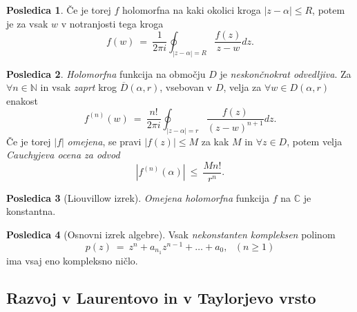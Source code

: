 \documentclass[11pt]{article}
\theoremstyle{definition}
\theoremstyle{definition}
\theoremstyle{definition}
\newtheorem*{posledica}{Posledica}
\begin{document}
\begin{posledica}

Če je torej  $f$ holomorfna na kaki okolici kroga $|z - \alpha| \leq R$, potem je za vsak $w$ v notranjosti tega kroga
$$f(w) ~=~ \frac{1}{2 \pi i} \oint_{|z - \alpha| = R} \frac{f(z)}{z - w} dz.$$

\end{posledica}
\vspace{0.5cm}

\begin{posledica}

\textit{Holomorfna} funkcija na območju $D$ je \textit{neskončnokrat odvedljiva}. Za $\forall n \in \mathbb{N}$ in vsak \textit{zaprt} krog $\overline{D}(\alpha, r)$, vsebovan v $D$, velja za $\forall w \in D(\alpha, r)$ enakost
$$f^{(n)}(w) ~=~ \frac{n!}{2 \pi i} \oint_{|z - \alpha| = r} \frac{f(z)}{(z - w)^{n+1}} dz.$$
Če je torej $|f|$ \textit{omejena}, se pravi $|f(z)| \leq M$ za kak $M$ in $\forall z \in D$, potem velja \textit{Cauchyjeva ocena za odvod}
$$|f^{(n)}(\alpha)| ~\leq~ \frac{Mn!}{r^n}.$$ 

\end{posledica}
\vspace{0.5cm}

\begin{posledica}[Liouvillow izrek]

\textit{Omejena holomorfna} funkcija $f$ na $\mathbb{C}$ je \\konstantna.

\end{posledica}
\vspace{0.5cm}

\begin{posledica}[Osnovni izrek algebre]

Vsak \textit{nekonstanten kompleksen} polinom 
$$p(z) ~=~ z^n + a_{n_1}z^{n-1} + \ldots + a_0, ~~~(n \geq 1)$$
ima vsaj eno kompleksno ničlo.

\end{posledica}
\vspace{0.5cm}


\subsection{Razvoj v Laurentovo in v Taylorjevo vrsto}
\vspace{0.5cm}
\end{document}
